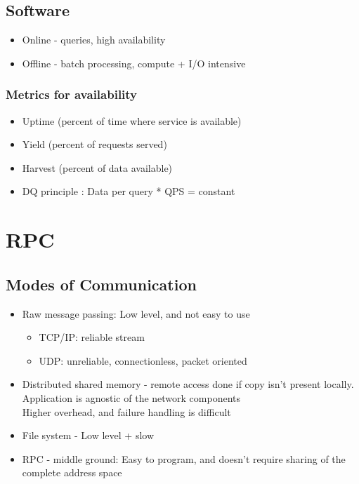 \documentclass[a4paper]{article}
\begin{document}
\subsection{Software}

\begin{itemize}
\item
    Online - queries, high availability
\item
    Offline - batch processing, compute + I/O intensive
\end{itemize}

\subsubsection{Metrics for availability}

\begin{itemize}
\item
    Uptime (percent of time where service is available)
\item
    Yield (percent of requests served)
\item
    Harvest (percent of data available)
\item
    DQ principle : Data per query * QPS = constant
\end{itemize}

\newpage

\section{RPC}

\subsection{Modes of Communication}

\begin{itemize}
\item
    Raw message passing: Low level, and not easy to use

    \begin{itemize}
        \item
        TCP/IP: reliable stream
    \item
        UDP: unreliable, connectionless, packet oriented
    \end{itemize}
\item
    Distributed shared memory - remote access done if copy isn't present
    locally. Application is agnostic of the network components\\
    Higher overhead, and failure handling is difficult
\item
    File system - Low level + slow
\item
    RPC - middle ground: Easy to program, and doesn't require sharing of
    the complete address space
\end{itemize}
\end{document}
